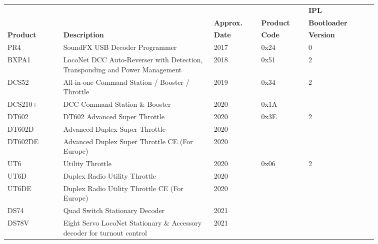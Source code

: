 \newpage
\begin{tabular}{|p{0.13\linewidth}|p{0.35\linewidth}|p{0.11\linewidth}|p{0.11\linewidth}|p{0.16\linewidth}|}
\hline
\textbf{} & \textbf{} & \textbf{} & \textbf{} & \textbf{IPL}\\
\textbf{} & \textbf{} & \textbf{Approx.} & \textbf{Product} & \textbf{Bootloader}\\
\textbf{Product} & \textbf{Description} & \textbf{Date} & \textbf{Code} & \textbf{Version}\\
\hline
PR4 & SoundFX USB Decoder Programmer & 2017 & 0x24 & 0\\
\hline
BXPA1 & LocoNet DCC Auto-Reverser with Detection, Transponding and Power Management & 2018 & 0x51 & 2\\
\hline
DCS52 & All-in-one Command Station / Booster / Throttle & 2019 & 0x34 & 2\\
\hline
DCS210+ & DCC Command Station \& Booster  & 2020 & 0x1A & \\
\hline
DT602 & DT602 Advanced Super Throttle & 2020 & 0x3E & 2\\
\hline
DT602D & Advanced Duplex Super Throttle & 2020 & & \\
\hline
DT602DE & Advanced Duplex Super Throttle CE (For Europe) & 2020 & & \\
\hline
UT6 &  Utility Throttle & 2020 & 0x06 & 2\\
\hline
UT6D & Duplex Radio Utility Throttle & 2020 &&\\
\hline
UT6DE & Duplex Radio Utility Throttle CE (For Europe) & 2020&& \\
\hline
DS74 & Quad Switch Stationary Decoder & 2021 &&\\
\hline
DS78V & Eight Servo LocoNet Stationary \& Accessory decoder for turnout control & 2021 &&\\
\hline
\end{tabular}
